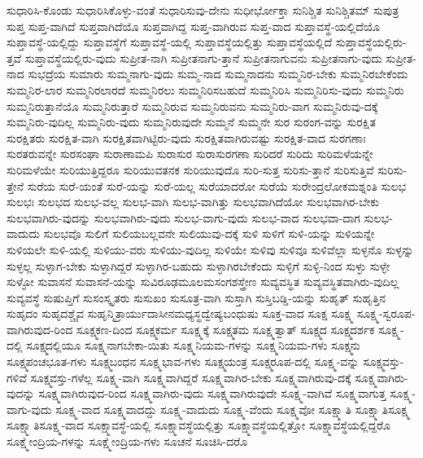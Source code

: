 {ಸುಧಾರಿಸಿ-ಕೊಂಡು
ಸುಧಾರಿಸಿಕೊಳ್ಳು-ವಂತೆ
ಸುಧಾರಿಸುವು-ದೇನು
ಸುಧೀರ್ಭೋಕ್ತಾ
ಸುನಿಶ್ಚಿತ
ಸುನಿಶ್ಚಿತಮ್
ಸುಪುತ್ರ
ಸುಪ್ತ
ಸುಪ್ತ-ವಾಗಿದೆ
ಸುಪ್ತವಾಗಿದೆಯೊ
ಸುಪ್ತವಾಗಿದ್ದ
ಸುಪ್ತ-ವಾಗಿರುವ
ಸುಪ್ತ-ವಾದ
ಸುಪ್ತಾವಸ್ಥೆ-ಯಲ್ಲಿದೆಯೊ
ಸುಪ್ತಾವಸ್ಥೆ-ಯಲ್ಲಿದ್ದು
ಸುಪ್ತಾವಸ್ಥೆಗೆ
ಸುಪ್ತಾವಸ್ಥೆ-ಯಲ್ಲಿ
ಸುಪ್ತಾವಸ್ಥೆಯಲ್ಲಿತ್ತು
ಸುಪ್ತಾವಸ್ಥೆಯಲ್ಲಿದೆ
ಸುಪ್ತಾವಸ್ಥೆಯಲ್ಲಿರು-ತ್ತವೆ
ಸುಪ್ತಾವಸ್ಥೆಯಲ್ಲಿರು-ವುದು
ಸುಪ್ರೀತ-ನಾಗಿ
ಸುಪ್ರೀತನಾಗು-ತ್ತಾನೆ
ಸುಪ್ರೀತನಾಗುವನು
ಸುಪ್ರೀತನಾಗು-ವುದು
ಸುಪ್ರೀತ-ನಾದ
ಸುಭದ್ರೆಯ
ಸುಮಾರು
ಸುಮ್ಮನಾಗು-ವುದು
ಸುಮ್ಮ-ನಾದ
ಸುಮ್ಮನಾದನು
ಸುಮ್ಮನಿರ-ಬೇಕು
ಸುಮ್ಮನಿರಬೇಕೆಂದು
ಸುಮ್ಮನಿರ-ಲಾರ
ಸುಮ್ಮನಿರಲಾರದೆ
ಸುಮ್ಮನಿರಲು
ಸುಮ್ಮನಿರಿಸಬಹುದೆ
ಸುಮ್ಮನಿರಿಸಿ
ಸುಮ್ಮನಿರಿಸು-ವುದು
ಸುಮ್ಮನಿರು
ಸುಮ್ಮನಿರುತ್ತಾನೆಯೊ
ಸುಮ್ಮನಿರುತ್ತಾರೆ
ಸುಮ್ಮನಿರುವ
ಸುಮ್ಮನಿರುವನು
ಸುಮ್ಮನಿರು-ವಾಗ
ಸುಮ್ಮನಿರುವು-ದಕ್ಕೆ
ಸುಮ್ಮನಿರು-ವುದಿಲ್ಲ
ಸುಮ್ಮನಿರು-ವುದು
ಸುಮ್ಮನಿರುವುದೇ
ಸುಮ್ಮನೆ
ಸುಮ್ಮನೇ
ಸುರ
ಸುರಂಗ-ವನ್ನು
ಸುರಕ್ಷಿತ
ಸುರಕ್ಷಿತರು
ಸುರಕ್ಷಿತ-ವಾಗಿ
ಸುರಕ್ಷಿತವಾಗಿಟ್ಟಿರು-ವುದು
ಸುರಕ್ಷಿತವಾಗಿರುವಷ್ಟು
ಸುರಕ್ಷಿತ-ವಾದ
ಸುರಗಣಾಃ
ಸುರತರುವನ್ನೇ
ಸುರಸಂಘಾ
ಸುರಾಣಾಮಪಿ
ಸುರಾಸುರ
ಸುರಾಸುರಗಣಾ
ಸುರಿದರೆ
ಸುರಿದು
ಸುರಿಮಳೆಯನ್ನೇ
ಸುರಿಮಳೆಯೇ
ಸುರಿಯುತ್ತಿದ್ದರೂ
ಸುರಿಯುವತನಕ
ಸುರಿಯುವುದೊ
ಸುರಿ-ಸುತ್ತ
ಸುರಿಸು-ತ್ತಾನೆ
ಸುರಿಸುತ್ತಿವೆ
ಸುರಿಸು-ತ್ತೇನೆ
ಸುರೆಯ
ಸುರೆ-ಯಂತೆ
ಸುರೆ-ಯನ್ನು
ಸುರೆ-ಯಲ್ಲ
ಸುರೆಯಾದರೋ
ಸುರೆಯೆ
ಸುರೇಂದ್ರಲೋಕಮಶ್ನಂತಿ
ಸುಲಭ
ಸುಲಭಃ
ಸುಲಭದ
ಸುಲಭ-ವಲ್ಲ
ಸುಲಭ-ವಾಗಿ
ಸುಲಭ-ವಾಗಿತ್ತು
ಸುಲಭವಾಗಿದೆಯೋ
ಸುಲಭವಾಗಿರ-ಬೇಕು
ಸುಲಭವಾಗಿರು-ವುದನ್ನು
ಸುಲಭವಾಗಿರು-ವುದು
ಸುಲಭ-ವಾಗು-ವುದು
ಸುಲಭ-ವಾದ
ಸುಲಭವಾ-ದಾಗ
ಸುಲಭ-ವಾದುದು
ಸುಲಭವೊ
ಸುಲಿಗೆ
ಸುಲಿಯಬಲ್ಲವನೇ
ಸುಲಿಯುವು-ದಕ್ಕೆ
ಸುಳಿ
ಸುಳಿಗೆ
ಸುಳಿ-ಯನ್ನು
ಸುಳಿಯನ್ನೇ
ಸುಳಿಯಲೇ
ಸುಳಿ-ಯಲ್ಲಿ
ಸುಳಿಯು-ವರು
ಸುಳಿಯು-ವುದಿಲ್ಲ
ಸುಳಿಯೇ
ಸುಳಿವು
ಸುಳಿವೂ
ಸುಳಿವೆಲ್ಲಾ
ಸುಳ್ಳನೊ
ಸುಳ್ಳನ್ನು
ಸುಳ್ಳಲ್ಲ
ಸುಳ್ಳಾಗ-ಬೇಕು
ಸುಳ್ಳಾಗಿದ್ದರೆ
ಸುಳ್ಳಾಗಿರ-ಬಹುದು
ಸುಳ್ಳಾಗಿರಬೇಕೆಂದು
ಸುಳ್ಳಿಗೆ
ಸುಳ್ಳಿ-ನಿಂದ
ಸುಳ್ಳು
ಸುಳ್ಳೇ
ಸುಳ್ಳೋ
ಸುವಾಸನೆ
ಸುವಾಸನೆ-ಯನ್ನು
ಸುವಿರೂಢಮೂಲಮಸಂಗಶಸ್ತ್ರೇಣ
ಸುವ್ಯವಸ್ಥಿತ
ಸುವ್ಯವಸ್ಥಿತವಾಗಿರು-ವುದಿಲ್ಲ
ಸುವ್ಯವಸ್ಥೆ
ಸುಷುಪ್ತಿಗೆ
ಸುಸಂಸ್ಕೃತರು
ಸುಸುಖಂ
ಸುಸೂತ್ರ-ವಾಗಿ
ಸುಸ್ತಾಗಿ
ಸುಸ್ತಿಬಡ್ಡಿ-ಯನ್ನು
ಸುಹೃತ್
ಸುಹೃತ್ತಿನ
ಸುಹೃದಂ
ಸುಹೃದಶ್ಚೈವ
ಸುಹೃನ್ಮಿತ್ರಾರ್ಯುದಾಸೀನಮಧ್ಯಸ್ಥದ್ವೇಷ್ಯಬಂಧುಷು
ಸೂಕ್ತ-ವಾದ
ಸೂಕ್ಷ
ಸೂಕ್ಷ್ಮ
ಸೂಕ್ಷ್ಮ-ಸ್ವರೂಪ-ವಾಗಿರುವುದ-ರಿಂದ
ಸೂಕ್ಷ್ಮಕಣ-ದಿಂದ
ಸೂಕ್ಷ್ಮಕರ್ಮ
ಸೂಕ್ಷ್ಮಕ್ಕೆ
ಸೂಕ್ಷ್ಮತಮ
ಸೂಕ್ಷ್ಮತ್ವಾತ್
ಸೂಕ್ಷ್ಮದ
ಸೂಕ್ಷ್ಮದರ್ಶಕ
ಸೂಕ್ಷ್ಮ-ದಲ್ಲಿ
ಸೂಕ್ಷ್ಮದಲ್ಲಿಯೂ
ಸೂಕ್ಷ್ಮನಾಗಬೇಕಾ-ಯಿತು
ಸೂಕ್ಷ್ಮನಿಯಮ-ಗಳನ್ನು
ಸೂಕ್ಷ್ಮನಿಯಮ-ಗಳು
ಸೂಕ್ಷ್ಮನು
ಸೂಕ್ಷ್ಮಪಂಚಭೂತ-ಗಳು
ಸೂಕ್ಷ್ಮಬಂಧನ
ಸೂಕ್ಷ್ಮಭಾವ-ಗಳು
ಸೂಕ್ಷ್ಮಯಂತ್ರ
ಸೂಕ್ಷ್ಮರೂಪ-ದಲ್ಲಿ
ಸೂಕ್ಷ್ಮ-ವನ್ನು
ಸೂಕ್ಷ್ಮವಸ್ತು-ಗಳಿವೆ
ಸೂಕ್ಷ್ಮವಸ್ತು-ಗಳೆಲ್ಲ
ಸೂಕ್ಷ್ಮ-ವಾಗಿ
ಸೂಕ್ಷ್ಮವಾಗಿದ್ದರೆ
ಸೂಕ್ಷ್ಮವಾಗಿರ-ಬೇಕು
ಸೂಕ್ಷ್ಮವಾಗಿರುವು-ದಕ್ಕೆ
ಸೂಕ್ಷ್ಮವಾಗಿರು-ವುದನ್ನು
ಸೂಕ್ಷ್ಮವಾಗಿರುವುದ-ರಿಂದ
ಸೂಕ್ಷ್ಮವಾಗಿರು-ವುದು
ಸೂಕ್ಷ್ಮವಾಗಿರುವುದೇ
ಸೂಕ್ಷ್ಮ-ವಾಗಿವೆ
ಸೂಕ್ಷ್ಮವಾಗುತ್ತ
ಸೂಕ್ಷ್ಮ-ವಾಗು-ವುದು
ಸೂಕ್ಷ್ಮ-ವಾದ
ಸೂಕ್ಷ್ಮವಾದದ್ದು
ಸೂಕ್ಷ್ಮ-ವಾದುದು
ಸೂಕ್ಷ್ಮ-ವೆಂದು
ಸೂಕ್ಷ್ಮವೋ
ಸೂಕ್ಷ್ಮಾತಿ
ಸೂಕ್ಷ್ಮಾತಿಸೂಕ್ಷ್ಮ
ಸೂಕ್ಷ್ಮಾತಿಸೂಕ್ಷ್ಮ-ವಾದ
ಸೂಕ್ಷ್ಮಾವಸ್ಥೆ-ಯಲ್ಲಿ
ಸೂಕ್ಷ್ಮಾವಸ್ಥೆಯಲ್ಲಿತ್ತು
ಸೂಕ್ಷ್ಮಾವಸ್ಥೆಯಲ್ಲಿತ್ತೋ
ಸೂಕ್ಷ್ಮಾವಸ್ಥೆಯಲ್ಲಿದ್ದರೊ
ಸೂಕ್ಷ್ಮೇಂದ್ರಿಯ-ಗಳನ್ನು
ಸೂಕ್ಷ್ಮೇಂದ್ರಿಯ-ಗಳು
ಸೂಚನೆ
ಸೂಚಿಸಿ-ದರೊ
}
